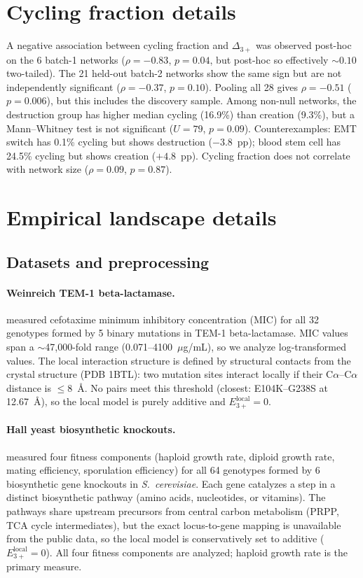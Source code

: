 \documentclass[10pt]{article}
\begin{document}
\section{Cycling fraction details}
\label{supp:cycling}

A negative association between cycling fraction and $\Delta_{3+}$
was observed post-hoc on the 6 batch-1 networks ($\rho = -0.83$,
$p = 0.04$, but post-hoc so effectively $\sim 0.10$ two-tailed).
The 21 held-out batch-2 networks show the same sign but are not
independently significant ($\rho = -0.37$, $p = 0.10$). Pooling
all 28 gives $\rho = -0.51$ ($p = 0.006$), but this includes the
discovery sample. Among non-null networks, the destruction group
has higher median cycling (16.9\%) than creation (9.3\%), but a
Mann--Whitney test is not significant ($U = 79$, $p = 0.09$).
Counterexamples: EMT switch has 0.1\% cycling but shows destruction
($-3.8$~pp); blood stem cell has 24.5\% cycling but shows creation
($+4.8$~pp). Cycling fraction does not correlate with network size
($\rho = 0.09$, $p = 0.87$).


\section{Empirical landscape details}
\label{supp:empirical}

\subsection*{Datasets and preprocessing}

\paragraph{Weinreich TEM-1 beta-lactamase.}
\citet{weinreich2006darwinian} measured cefotaxime minimum
inhibitory concentration (MIC) for all 32 genotypes formed by 5
binary mutations in TEM-1 beta-lactamase. MIC values span a
$\sim$47{,}000-fold range (0.071--4100~$\mu$g/mL), so we analyze
log-transformed values. The local interaction structure is defined
by structural contacts from the crystal structure (PDB 1BTL): two
mutation sites interact locally if their C$\alpha$--C$\alpha$
distance is $\leq 8$~\AA. No pairs meet this threshold (closest:
E104K--G238S at 12.67~\AA), so the local model is purely additive
and $E_{3+}^{\mathrm{local}} = 0$.

\paragraph{Hall yeast biosynthetic knockouts.}
\citet{hall2010fitness} measured four fitness components (haploid
growth rate, diploid growth rate, mating efficiency, sporulation
efficiency) for all 64 genotypes formed by 6 biosynthetic gene
knockouts in \emph{S.~cerevisiae}. Each gene catalyzes a step in a
distinct biosynthetic pathway (amino acids, nucleotides, or
vitamins). The pathways share upstream precursors from central
carbon metabolism (PRPP, TCA cycle intermediates), but the exact
locus-to-gene mapping is unavailable from the public data, so the
local model is conservatively set to additive
($E_{3+}^{\mathrm{local}} = 0$). All four fitness components are
analyzed; haploid growth rate is the primary measure.
\end{document}
